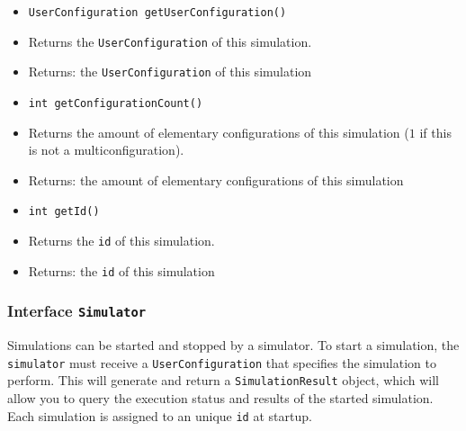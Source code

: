 \documentclass[parskip=full,11pt]{scrartcl}
\begin{document}
\begin{itemize}
	\item \texttt{UserConfiguration getUserConfiguration()}
	\item[] Returns the \texttt{UserConfiguration} of this simulation.
	\item[] Returns: the \texttt{UserConfiguration} of this simulation
	
	\item \texttt{int getConfigurationCount()}
	\item[] Returns the amount of elementary configurations of this simulation (\(1\) if this is not a multiconfiguration).
	\item[] Returns: the amount of elementary configurations of this simulation
	
	\item \texttt{int getId()}
	\item[] Returns the \texttt{id} of this simulation.
	\item[] Returns: the \texttt{id} of this simulation
\end{itemize}

\subsubsection{Interface \texttt{Simulator}}
Simulations can be started and stopped by a simulator. To start a simulation, the \texttt{simulator} must receive a \texttt{UserConfiguration} that specifies the simulation to perform. This will generate and return a \texttt{SimulationResult} object, which will allow you to query the execution status and results of the started simulation. Each simulation is assigned to an unique \texttt{id} at startup.
\end{document}
